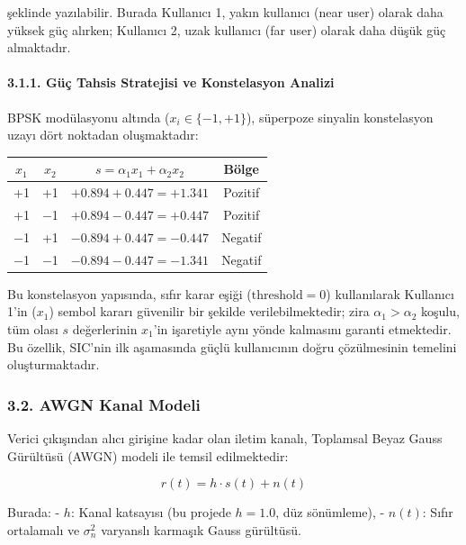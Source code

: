 \documentclass[
]{IEEEtran}
\newcounter{none} %
\begin{document}
şeklinde yazılabilir. Burada Kullanıcı 1, yakın kullanıcı (near user)
olarak daha yüksek güç alırken; Kullanıcı 2, uzak kullanıcı (far user)
olarak daha düşük güç almaktadır.

\paragraph{3.1.1. Güç Tahsis Stratejisi ve Konstelasyon
Analizi}\label{guxfcuxe7-tahsis-stratejisi-ve-konstelasyon-analizi}

BPSK modülasyonu altında (\(x_i \in \{-1, +1\}\)), süperpoze sinyalin
konstelasyon uzayı dört noktadan oluşmaktadır:

{\def\LTcaptype{none} %
\begin{longtable}[]{@{}cccc@{}}
\toprule\noalign{}
\(x_1\) & \(x_2\) & \(s = \alpha_1 x_1 + \alpha_2 x_2\) & Bölge \\
\midrule\noalign{}
\endhead
\bottomrule\noalign{}
\endlastfoot
+1 & +1 & \(+0.894 + 0.447 = +1.341\) & Pozitif \\
+1 & −1 & \(+0.894 − 0.447 = +0.447\) & Pozitif \\
−1 & +1 & \(−0.894 + 0.447 = −0.447\) & Negatif \\
−1 & −1 & \(−0.894 − 0.447 = −1.341\) & Negatif \\
\end{longtable}
}

Bu konstelasyon yapısında, sıfır karar eşiği (\(\text{threshold} = 0\))
kullanılarak Kullanıcı 1'in (\(x_1\)) sembol kararı güvenilir bir
şekilde verilebilmektedir; zira \(\alpha_1 > \alpha_2\) koşulu, tüm
olası \(s\) değerlerinin \(x_1\)'in işaretiyle aynı yönde kalmasını
garanti etmektedir. Bu özellik, SIC'nin ilk aşamasında güçlü
kullanıcının doğru çözülmesinin temelini oluşturmaktadır.

\subsubsection{3.2. AWGN Kanal Modeli}\label{awgn-kanal-modeli}

Verici çıkışından alıcı girişine kadar olan iletim kanalı, Toplamsal
Beyaz Gauss Gürültüsü (AWGN) modeli ile temsil edilmektedir:

\[r(t) = h \cdot s(t) + n(t)\]

Burada: - \(h\): Kanal katsayısı (bu projede \(h = 1.0\), düz
sönümleme), - \(n(t)\): Sıfır ortalamalı ve \(\sigma_n^2\) varyanslı
karmaşık Gauss gürültüsü.
\end{document}
